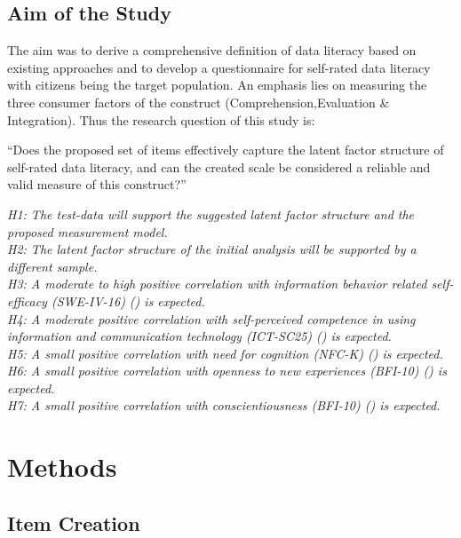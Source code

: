 \documentclass[
  12pt,
  a4paper,
  twoside]{article}
\begin{document}
\subsection{Aim of the Study}\label{aim-of-the-study}

The aim was to derive a comprehensive definition of data literacy based on existing approaches and to develop a questionnaire for self-rated data literacy with citizens being the target population. An emphasis lies on measuring the three consumer factors of the construct (Comprehension,Evaluation \& Integration). Thus the research question of this study is:

``Does the proposed set of items effectively capture the latent factor structure of self-rated data literacy, and can the created scale be considered a reliable and valid measure of this construct?''

\emph{H1: The test-data will support the suggested latent factor structure and the proposed measurement model.}\\
\emph{H2: The latent factor structure of the initial analysis will be supported by a different sample.}\\
\emph{H3: A moderate to high positive correlation with information behavior related self-efficacy (SWE-IV-16) () is expected.}\\
\emph{H4: A moderate positive correlation with self-perceived competence in using information and communication technology (ICT-SC25) () is expected.}\\
\emph{H5: A small positive correlation with need for cognition (NFC-K) () is expected.}\\
\emph{H6: A small positive correlation with openness to new experiences (BFI-10) () is expected.}\\
\emph{H7: A small positive correlation with conscientiousness (BFI-10) () is expected.}

\section{Methods}\label{methods}

\subsection{Item Creation}\label{item-creation}
\end{document}
